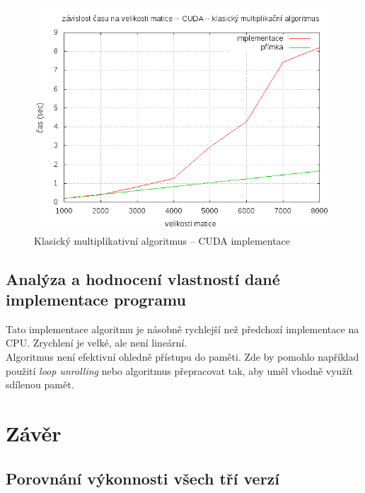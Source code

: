 \documentclass[12pt,a4paper]{article}
\begin{document}
\pagebreak
\begin{figure}[h]
\includegraphics[width=\textwidth]{graph/cuda/cuda1.png}
\caption{Klasický multiplikativní algoritmus -- CUDA implementace}
\label{cuda1}
\end{figure}


\subsection{Analýza a hodnocení vlastností dané implementace programu}

Tato implementace algoritmu je násobně rychlejší než předchozí implementace na CPU. Zrychlení je velké, ale není lineární. \\

Algoritmus není efektivní ohledně přístupu do paměti. Zde by pomohlo například použití \textit{loop unrolling} nebo algoritmus přepracovat tak, aby uměl vhodně využít sdílenou pamět.


\section{Závěr}

\subsection{Porovnání výkonnosti všech tří verzí}
\end{document}
